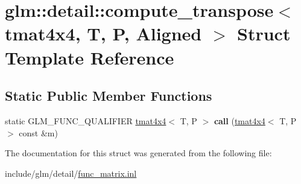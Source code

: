 \hypertarget{structglm_1_1detail_1_1compute__transpose_3_01tmat4x4_00_01T_00_01P_00_01Aligned_01_4}{}\section{glm\+:\+:detail\+:\+:compute\+\_\+transpose$<$ tmat4x4, T, P, Aligned $>$ Struct Template Reference}
\label{structglm_1_1detail_1_1compute__transpose_3_01tmat4x4_00_01T_00_01P_00_01Aligned_01_4}
\subsection*{Static Public Member Functions}
\begin{DoxyCompactItemize}
\item 
\mbox{\label{structglm_1_1detail_1_1compute__transpose_3_01tmat4x4_00_01T_00_01P_00_01Aligned_01_4_a74c86f68f3e98893acab5d4b504df64c}} 
static G\+L\+M\+\_\+\+F\+U\+N\+C\+\_\+\+Q\+U\+A\+L\+I\+F\+I\+ER \hyperlink{structglm_1_1tmat4x4}{tmat4x4}$<$ T, P $>$ {\bfseries call} (\hyperlink{structglm_1_1tmat4x4}{tmat4x4}$<$ T, P $>$ const \&m)
\end{DoxyCompactItemize}


The documentation for this struct was generated from the following file\+:\begin{DoxyCompactItemize}
\item 
include/glm/detail/\hyperlink{func__matrix_8inl}{func\+\_\+matrix.\+inl}\end{DoxyCompactItemize}
